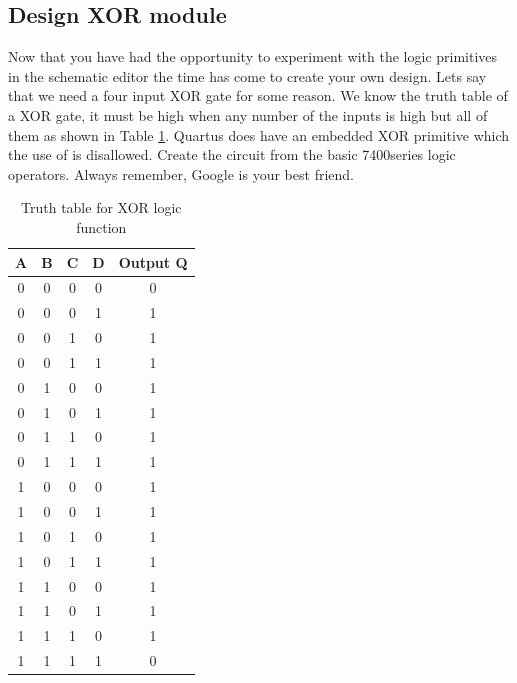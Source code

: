 \documentclass[12pt,journal]{IEEEtran}
\begin{document}
      \subsection{Design XOR module} 
        Now that you have had the opportunity to experiment with the logic primitives in the schematic editor the time has come to create your own design. Lets say that we need a four input XOR gate for some reason. We know the truth table of a XOR gate, it must be high when any number of the inputs is high but all of them as shown in Table \ref{XORTT}. Quartus does have an embedded XOR primitive which the use of is disallowed. Create the circuit from the basic 7400series logic operators. Always remember, Google is your best friend. 
        \begin{table}[H]
          \renewcommand{\arraystretch}{1.3}
            \caption{Truth table for XOR logic function}
            \label{XORTT}
            \centering
            \begin{tabular}{c|c|c|c|c}
            \hline
              A &B &C &D &Output Q \\
            \hline\hline
              0 &0 &0 &0 &0\\
              0 &0 &0 &1 &1\\
              0 &0 &1 &0 &1\\
              0 &0 &1 &1 &1\\
              0 &1 &0 &0 &1\\
              0 &1 &0 &1 &1\\
              0 &1 &1 &0 &1\\
              0 &1 &1 &1 &1\\
              1 &0 &0 &0 &1\\
              1 &0 &0 &1 &1\\
              1 &0 &1 &0 &1\\
              1 &0 &1 &1 &1\\
              1 &1 &0 &0 &1\\
              1 &1 &0 &1 &1\\
              1 &1 &1 &0 &1\\
              1 &1 &1 &1 &0\\
            \hline
            \end{tabular}
          \end{table}
\end{document}
